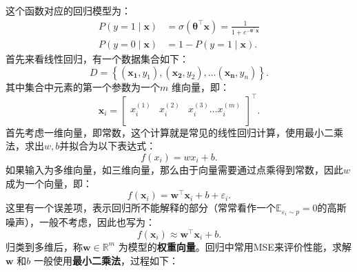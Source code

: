 这个函数对应的回归模型为：
\begin{align*}
    P\left( y=1\mid \bm{x} \right)&=\sigma\left( \bm{\theta}^\top \bm{x} \right) = \frac{1}{1+e^{-\bm{\theta^\top}\bm{x}}}\\
    P\left( y=0\mid \bm{x} \right) &= 1-P\left( y=1\mid \bm{x} \right)
.\end{align*}
首先来看线性回归，有一个数据集合如下：
\[
    D = \left\{ \left( \bm{x_1},y_1 \right),\left( \bm{x_2},y_2 \right),\ldots \left( \bm{x_{n}},y_{n} \right) \right\}
.\]
其中集合中元素的第一个参数为一个$m$ 维向量，即：\[
    \bm{x}_i = \begin{bmatrix}
        x_{i}^{(1)}&x_{i}^{(2)}&x_{i}^{(3)}\ldots x_{i}^{(m)}\\
    \end{bmatrix}^\top 
.\]
首先考虑一维向量，即常数，这个计算就是常见的线性回归计算，使用最小二乘法，求出$w,b$并拟合为以下表达式：\[
    f\left( x_{i} \right) = w x_{i} + b
.\]
如果输入为多维向量，如三维向量，那么由于向量需要通过点乘得到常数，因此$w$ 成为一个向量，即：
\[
    f\left( \bm{x}_i \right) = \bm{w}^\top \bm{x}_i+b+\varepsilon_{i}
.\]
这里有一个误差项，表示回归所不能解释的部分（常常看作一个$\mathbb{E}_{\varepsilon_{i}\sim p}=0$的高斯噪声），一般不考虑，因此也写为：\[
    f\left( \bm{x}_i \right) \approx \bm{w}^\top \bm{x}_i+b
.\]
归类到多维后，称$\bm{w}\in \mathbb{R}^{m}$ 为模型的\textbf{权重向量}。回归中常用MSE来评价性能，求解$\bm{w}$ 和$b$ 一般使用\textbf{最小二乘法}，过程如下：
